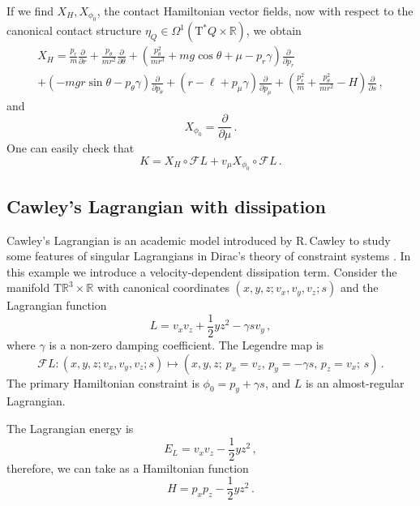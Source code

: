 \documentclass[11pt]{article}
\theoremstyle{plain}
\theoremstyle{definition}
\newcommand{\R}{\mathbb{R}}
\newcommand{\T}{{\mathrm T}}
\let\Tan\T
\newcommand{\parder}[2]{\frac{\partial #1}{\partial #2}}
\def\Tan{\mathrm{T}}
\def\FL{\mathcal{F} L}
\begin{document}
If we find $X_H, X_{\phi_0}$, the contact Hamiltonian vector fields, now with respect to the canonical contact structure $\eta_Q \in \Omega^1(\Tan ^* Q\times \R)$, we obtain
\begin{multline}
    X_H = \frac{p_r}{m}\parder{}{r}+\frac{p_{\theta}}{mr^2}\parder{}{\theta}+\left(\frac{p_{\theta}^2}{mr^3}+mg\cos\theta + \mu -p_r\gamma\right)\parder{}{p_r}  \\+(-mgr\sin\theta -p_{\theta}\gamma)\parder{}{p_\theta}+(r-\ell +p_{\mu}\gamma)\parder{}{p_{\mu}}+ \left(\frac{p_r^2}{m}+ \frac{p_\theta^2}{mr^2}-H \right)\parder{}{s}\,,
\end{multline}
and 
\begin{equation}
     X_{\phi_0} = \parder{}{\mu}\,.
\end{equation}
One can easily check that 
$$K = X_H  \circ \FL + v_{\mu} X_{\phi_0}\circ \FL\,.$$


\subsection{Cawley's Lagrangian with dissipation}

Cawley's Lagrangian is an academic model introduced by R.\,Cawley to study some features of singular Lagrangians in Dirac's theory of constraint systems \cite{Caw_79}. 
In this example we introduce a velocity-dependent dissipation term. Consider the manifold $\Tan\R^3\times\R$ with canonical coordinates $(x,y,z;v_x,v_y,v_z;s)$ and the Lagrangian function
$$ 
L = v_xv_z + \frac{1}{2}yz^2 - \gamma s v_y
\,,
$$
where $\gamma$ is a non-zero damping coefficient. 
The Legendre map is
$$ 
\FL\colon(x,y,z;v_x,v_y,v_z;s) \longmapsto 
(x,y,z;\,p_x=v_z,\,p_y = -\gamma s,\,p_z = v_x;\,s)  \,.
$$
The primary Hamiltonian constraint is 
$\phi_0 = p_y+ \gamma s$,
and $L$ is an almost-regular Lagrangian.

The Lagrangian energy is
$$ E_L = v_xv_z - \frac{1}{2}yz^2\,, $$
therefore, we can take as a Hamiltonian function
$$
H = p_x p_z - \frac{1}{2}yz^2\,.
$$
\end{document}
